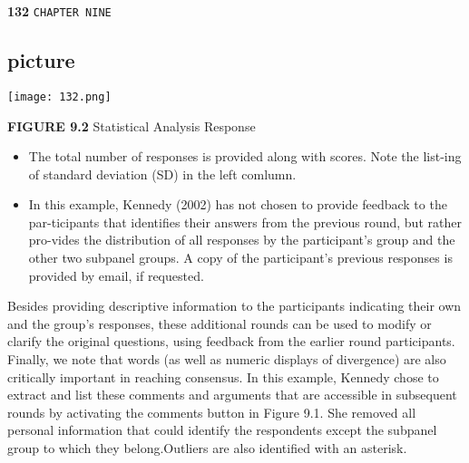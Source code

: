 \documentclass[12pt]{article}
\begin{document}
\newpage
\begin{flushleft}
\textbf{132}\hspace*{1cm} \texttt{CHAPTER NINE}
\end{flushleft}

\vspace*{0.3cm}
\begin{center}
\section{picture}
\texttt{[image: 132.png]}

\textbf{FIGURE 9.2} \hspace*{0.1cm} Statistical Analysis Response \\
\end{center}

\vspace*{0.3cm}
\begin{itemize}
  \item The total number of responses is provided along with scores. Note the list-ing of standard deviation (SD) in the left comlumn.\\
  \item In this example, Kennedy (2002) has not chosen to provide feedback to the par-ticipants that identifies their answers from the previous round, but rather pro-vides the distribution of all responses by the participant's group and the other two subpanel groups. A copy of the participant's previous responses is provided by email, if requested.\\
\end{itemize}

\vspace*{0.2cm}
Besides providing descriptive information to the participants indicating their own and the group's responses, these additional rounds can be used to modify or clarify the original questions, using feedback from the earlier round participants.\\
\hspace{0.5cm} Finally, we note that words (as well as numeric displays of divergence) are also critically important in reaching consensus. In this example, Kennedy chose to extract and list these comments and arguments that are accessible in subsequent rounds by activating the comments button in Figure 9.1. She removed all personal information that could identify the respondents except the subpanel group to which they belong.Outliers are also identified with an asterisk.\\
\end{document}
